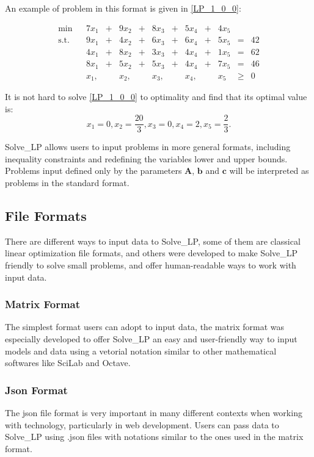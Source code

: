 \documentclass[12pt,hidelinks]{article}
\newcommand{\st}{\operatorname{s.t.}}
\begin{document}
		An example of problem in this format is given in \eqref{LP_1_0_0}:

			\begin{equation}\label{LP_1_0_0}
				\begin{array}{llrcrcrcrcrcr}
				\min  & & 7x_1  & + & 9x_2  & + & 8x_3  & + & 5x_4  & + & 4x_5 &           &    \\
				\st   & & 9x_1  & + & 4x_2  & + & 6x_3  & + & 6x_4  & + & 5x_5 & =         & 42 \\
					  & & 4x_1  & + & 8x_2  & + & 3x_3  & + & 4x_4  & + & 1x_5 & =         & 62 \\
					  & & 8x_1  & + & 5x_2  & + & 5x_3  & + & 4x_4  & + & 7x_5 & =         & 46 \\
					  & &  x_1, &   &  x_2, &   &  x_3, &   &  x_4, &   &  x_5 & \geqslant & 0
				\end{array}
				\tag{LP1}
			\end{equation}

		It is not hard to solve \eqref{LP_1_0_0} to optimality and find that its optimal value is:
		$$x_1 = 0, x_2 = \frac{20}{3}, x_3 = 0, x_4 = 2, x_5 = \frac{2}{3}.$$

		Solve\_LP allows users to input problems in more general formats, including inequality constraints and redefining the variables lower and upper bounds. Problems input defined only by the parameters $\mathbf{A}$, $\mathbf{b}$ and $\mathbf{c}$ will be interpreted as problems in the standard format.
	
	\subsection{File Formats}
		There are different ways to input data to Solve\_LP, some of them are classical linear optimization file formats, and others were developed to make Solve\_LP friendly to solve small problems, and offer human-readable ways to work with input data.
		\subsubsection{Matrix Format}
			The simplest format users can adopt to input data, the matrix format was especially developed to offer Solve\_LP an easy and user-friendly way to input models and data using a vetorial notation similar to other mathematical softwares like SciLab and Octave.

		\subsubsection{Json Format}
			The json file format is very important in many different contexts when working with technology, particularly in web development. Users can pass data to Solve\_LP using .json files with notations similar to the ones used in the matrix format.
\end{document}
